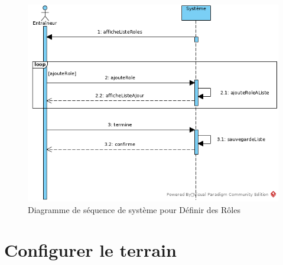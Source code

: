 \begin{figure}[htpb]
    \centering
    \includegraphics[scale=0.5]{fig/ssd_definir_role.png}
    \caption{Diagramme de séquence de système pour Définir des Rôles}
    \label{fig:ssd_definir_role}
\end{figure}



\section{Configurer le terrain}
\label{sec:configurer_le_terrain}

